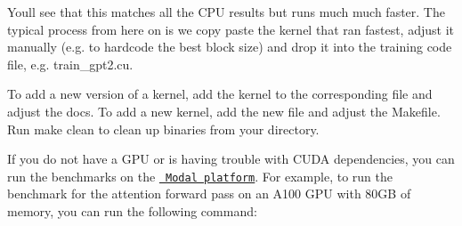 \begin{DoxyCode}{0}

\end{DoxyCode}


You\textquotesingle{}ll see that this matches all the CPU results but runs much much faster. The typical process from here on is we copy paste the kernel that ran fastest, adjust it manually (e.\+g. to hardcode the best block size) and drop it into the training code file, e.\+g. {\ttfamily train\+\_\+gpt2.\+cu}.

To add a new version of a kernel, add the kernel to the corresponding file and adjust the docs. To add a new kernel, add the new file and adjust the Makefile. Run {\ttfamily make clean} to clean up binaries from your directory.

If you do not have a GPU or is having trouble with CUDA dependencies, you can run the benchmarks on the \href{http://modal.com}{\texttt{ Modal platform}}. For example, to run the benchmark for the attention forward pass on an A100 GPU with 80GB of memory, you can run the following command\+:


\begin{DoxyCode}{0}

\end{DoxyCode}
 